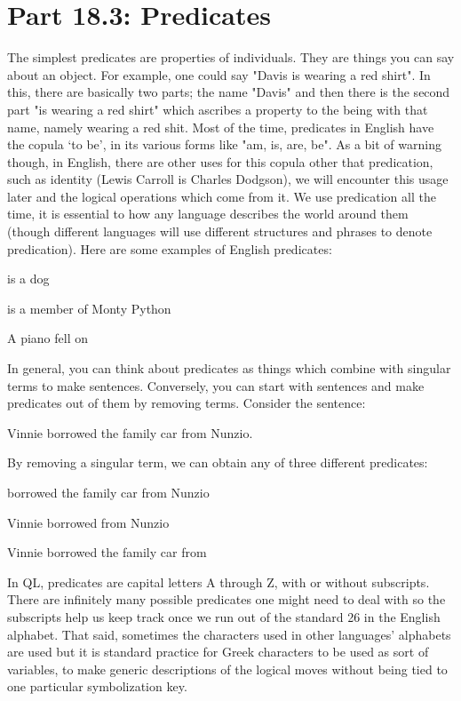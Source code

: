 \section{Part 18.3: Predicates}
The simplest \glspl{predicate} are properties of individuals. They are things you can say about an object. For example, one could say "Davis is wearing a red shirt". In this, there are basically two parts; the name "Davis" and then there is the second part "is wearing a red shirt" which ascribes a property to the being with that name, namely wearing a red shit. Most of the time, predicates in English have the copula ‘to be', in its various forms like "am, is, are, be". As a bit of warning though, in English, there are other uses for this copula other that predication, such as identity (Lewis Carroll is Charles Dodgson), we will encounter this usage later and the logical operations which come from it. We use predication all the time, it is essential to how any language describes the world around them (though different languages will use different structures and phrases to denote predication). Here are some examples of English predicates:
\begin{earg}
\item[]\blank is a dog
\item[]\blank  is a member of Monty Python
\item[]A piano fell on \blank 
\end{earg}
In general, you can think about predicates as things which combine with singular terms to make sentences. Conversely, you can start with sentences and make predicates out of them by removing terms. Consider the sentence:
\begin{center}
Vinnie borrowed the family car from Nunzio.
\end{center}
By removing a singular term, we can obtain any of three different predicates:
\begin{earg}
\item[] \blank  borrowed the family car from Nunzio
\item[] Vinnie borrowed \blank  from Nunzio
\item[] Vinnie borrowed the family car from \blank 
\end{earg}
In QL, predicates are capital letters A through Z, with or without subscripts. There are infinitely many possible predicates one might need to deal with so the subscripts help us keep track once we run out of the standard 26 in the English alphabet. That said, sometimes the characters used in other languages' alphabets are used but it is standard practice for Greek characters to be used as sort of variables, to make generic descriptions of the logical moves without being tied to one particular symbolization key.

